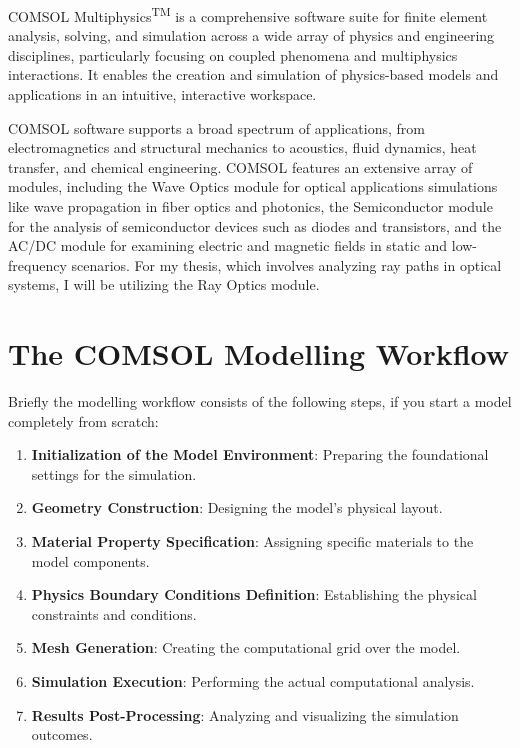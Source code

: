 COMSOL Multiphysics\textsuperscript{TM} is a comprehensive software suite for finite element analysis, solving, and simulation across a wide array of physics and engineering disciplines, particularly focusing on coupled phenomena and multiphysics interactions. It enables the creation and simulation of physics-based models and applications in an intuitive, interactive workspace.

COMSOL software supports a broad spectrum of applications, from electromagnetics and structural mechanics to acoustics, fluid dynamics, heat transfer, and chemical engineering. COMSOL features an extensive array of modules, including the Wave Optics module for optical applications simulations like wave propagation in fiber optics and photonics, the Semiconductor module for the analysis of semiconductor devices such as diodes and transistors, and the AC/DC module for examining electric and magnetic fields in static and low-frequency scenarios. For my thesis, which involves analyzing ray paths in optical systems, I will be utilizing the Ray Optics module.

\section{The COMSOL Modelling Workflow}
Briefly the modelling workflow consists of the following steps, if you start a model completely from scratch:

\begin{enumerate}
    \item \textbf{Initialization of the Model Environment}: Preparing the foundational settings for the simulation.
    \item \textbf{Geometry Construction}: Designing the model's physical layout.
    \item \textbf{Material Property Specification}: Assigning specific materials to the model components.
    \item \textbf{Physics Boundary Conditions Definition}: Establishing the physical constraints and conditions.
    \item \textbf{Mesh Generation}: Creating the computational grid over the model.
    \item \textbf{Simulation Execution}: Performing the actual computational analysis.
    \item \textbf{Results Post-Processing}: Analyzing and visualizing the simulation outcomes.
\end{enumerate}


